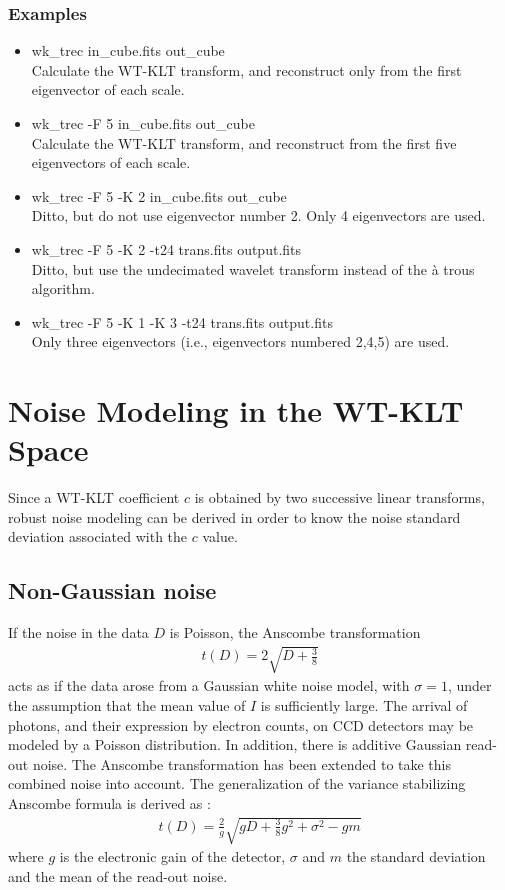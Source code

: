 \subsubsection*{Examples}
\begin{itemize}
\baselineskip=0.4truecm
\itemsep=0.1truecm
\item wk\_trec in\_cube.fits out\_cube \\
Calculate the WT-KLT transform, and reconstruct only from the 
first eigenvector of each scale.
\item wk\_trec -F 5 in\_cube.fits out\_cube  \\
Calculate the WT-KLT transform, and reconstruct from the 
first five eigenvectors of each scale.
\item wk\_trec -F 5 -K 2 in\_cube.fits out\_cube  \\
Ditto, but do not use eigenvector number 2. Only 4 eigenvectors are
used.
\item wk\_trec -F 5 -K 2 -t24  trans.fits output.fits \\
Ditto, but use the undecimated wavelet transform instead of the 
\`a trous algorithm.
\item wk\_trec -F 5 -K 1 -K 3 -t24  trans.fits output.fits \\
Only three eigenvectors (i.e., eigenvectors numbered 2,4,5) are used. 
\end{itemize}


\section{Noise Modeling in the WT-KLT Space}
Since a WT-KLT coefficient $c$ is obtained by two successive linear 
transforms, robust noise modeling can be derived in order to know 
 the noise standard deviation associated with the $c$ value.

\subsection{Non-Gaussian noise}
If the noise in the data $D$ is Poisson, the Anscombe transformation 
\cite{rest:anscombe48}
\begin{eqnarray}
t(D) = 2\sqrt{D + \frac{3}{8}}
\end{eqnarray}
acts as if the data arose from a
Gaussian white noise model, with $\sigma = 1$, under the
assumption that the mean value of $I$ is sufficiently large.
The arrival of photons, and their expression by electron counts, on CCD
detectors may be modeled by a Poisson distribution.  In addition, there is 
additive Gaussian read-out noise. The Anscombe 
transformation has been extended to take this combined noise into 
account.  The  generalization of the variance stabilizing
Anscombe formula is derived as \cite{starck:book98}:
\begin{eqnarray}
t(D) = \frac{2}{g} \sqrt{g D + \frac{3}{8} g^2 + \sigma^2 - g m}
\end{eqnarray}
where $g$ is the electronic gain of the detector, $\sigma$ and $m$ the standard deviation 
and the mean of the read-out noise. 
 

